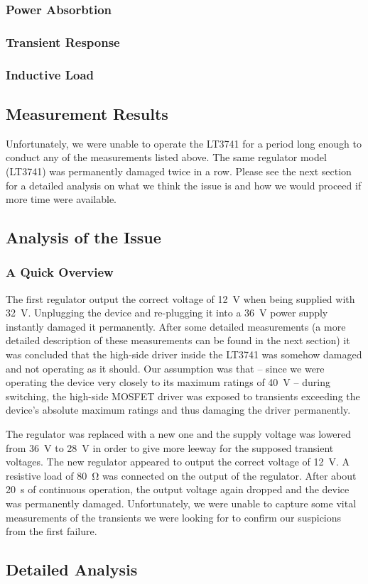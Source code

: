 \subsubsection{Power Absorbtion}


\subsubsection{Transient Response}


\subsubsection{Inductive Load}


\subsection{Measurement Results}

Unfortunately, we were unable to  operate the LT3741 for a period long enough to
conduct any of the measurements listed above.  The same regulator model (LT3741)
was  permanently  damaged  twice  in  a row. Please see the next section  for  a
detailed analysis on what we think the issue is and how we would proceed if more
time were available.


\subsection{Analysis of the Issue}

\subsubsection{A Quick Overview}

The first regulator output the  correct  voltage  of  \SI{12}{\volt}  when being
supplied with \SI{32}{\volt}.  Unplugging  the  device and re-plugging it into a
\SI{36}{\volt}  power  supply  instantly  damaged  it  permanently.  After  some
detailed measurements (a more detailed description of  these measurements can be
found in the next section) it was concluded that the high-side driver inside the
LT3741 was somehow damaged  and  not  operating as it should. Our assumption was
that -- since we were operating the device very  closely  to its maximum ratings
of  \SI{40}{\volt} -- during switching, the high-side MOSFET driver was  exposed
to transients exceeding the device's absolute maximum  ratings and thus damaging
the driver permanently.

The  regulator  was  replaced with a new one and the supply voltage was  lowered
from \SI{36}{\volt} to \SI{28}{\volt} in order  to  give  more  leeway  for  the
supposed transient voltages. The new  regulator  appeared  to output the correct
voltage of  \SI{12}{\volt}.  A  resistive load of \SI{80}{\ohm} was connected on
the output  of  the  regulator.  After  about  \SI{20}{\second}  of  continuous
operation,  the  output  voltage  again  dropped and the device was  permanently
damaged. Unfortunately, we were unable to capture some vital measurements of the
transients we were looking for to confirm our suspicions from the first failure.


\subsection{Detailed Analysis}


